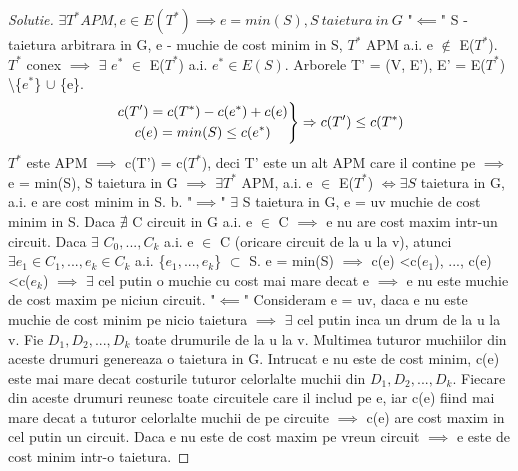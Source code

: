 \documentclass[12pt]{article}
\newenvironment{rcases}
 {\left.\begin{aligned}}
 	{\end{aligned}\right\rbrace}
\begin{document}
\begin{proof}[Solutie]
$\exists T^* APM, e \in E(T^*) \implies e = min(S), S\ taietura\ in\ G$
\newline\newline
"$\impliedby$"
\newline
S - taietura arbitrara in G, e - muchie de cost minim in S, $T^*$ APM a.i. e $\notin$ E($T^*$). $T^*$ conex $\implies$ $\exists$ $e^*$ $\in$ E($T^*$) a.i. $e^* \in E(S)$.
\newline
Arborele T' = (V, E'), E' = E($T^*$) \textbackslash \{$e^*$\} $\cup$ \{e\}.
\newline
\[
\begin{rcases}
\begin{gathered}
c(T') = c(T^*) - c(e^*) + c(e)\\
c(e) = min(S) \leq c(e^*)
\end{gathered} \end{rcases} \Rightarrow \begin{gathered}
c(T') \leq c(T^*)
\end{gathered}
\]
$T^*$ este APM $\implies$ c(T') = c($T^*$), deci T' este un alt APM care il contine pe $\implies$ e = min(S), S taietura in G $\implies$ $\exists T^*$ APM, a.i. e $\in$ E($T^*$) $\Longleftrightarrow \exists S$ taietura in G, a.i. e are cost minim in S.
\newline\newline
b.
\newline
"$\implies$"
\newline
$\exists$ S taietura in G, e = uv muchie de cost minim in S. Daca $\nexists$ C circuit in G a.i. e $\in$ C $\implies$ e nu are cost maxim intr-un circuit. 
\newline
Daca $\exists$ $C_0, ..., C_k$ a.i. e $\in$ C (oricare circuit de la u la v), atunci $\exists e_1 \in C_1, ..., e_k \in C_k$ a.i. \{$e_1, ..., e_k$\} $\subset$ S.
\newline
e = min(S) $\implies$ c(e) \textless c($e_1$), ..., c(e) \textless c($e_k$) $\implies$ $\exists$ cel putin o muchie cu cost mai mare decat e $\implies$ e nu este muchie de cost maxim pe niciun circuit.
\newline\newline
"$\impliedby$"
\newline
Consideram e = uv, daca e nu este muchie de cost minim pe nicio taietura $\implies$ $\exists$ cel putin inca un drum de la u la v.
Fie $D_1, D_2, ..., D_k$ toate drumurile de la u la v. Multimea tuturor muchiilor din aceste drumuri genereaza o taietura in G. Intrucat e nu este de cost minim, c(e) este mai mare decat costurile tuturor celorlalte muchii din $D_1, D_2, ..., D_k$. Fiecare din aceste drumuri reunesc toate circuitele care il includ pe e, iar c(e) fiind mai mare decat a tuturor celorlalte muchii de pe circuite $\implies$ c(e) are cost maxim in cel putin un circuit. Daca e nu este de cost maxim pe vreun circuit $\implies$ e este de cost minim intr-o taietura.

\end{proof}
\end{document}
